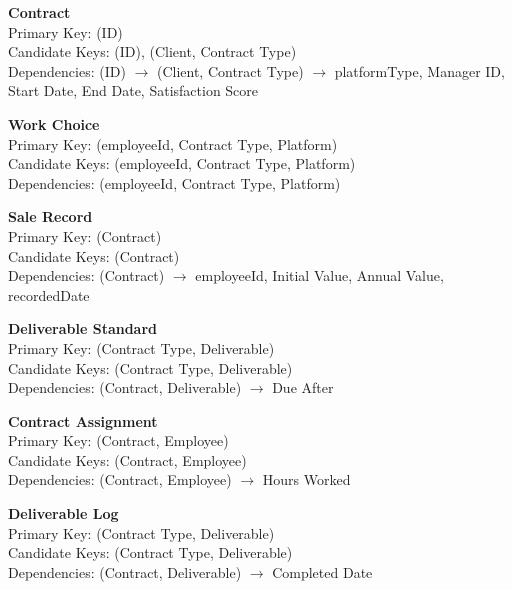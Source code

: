\documentclass[12pt, letterpaper]{article}
\begin{document}
\textbf{Contract}\\
Primary Key: (ID)\\
Candidate Keys: (ID), (Client, Contract Type)\\
Dependencies: (ID) $\rightarrow$ (Client, Contract Type) $\rightarrow$ platformType, Manager ID, Start Date, End Date, Satisfaction Score

\textbf{Work Choice}\\
Primary Key: (employeeId, Contract Type, Platform)\\
Candidate Keys: (employeeId, Contract Type, Platform)\\
Dependencies: (employeeId, Contract Type, Platform)

\textbf{Sale Record}\\
Primary Key: (Contract)\\
Candidate Keys: (Contract)\\
Dependencies: (Contract) $\rightarrow$ employeeId, Initial Value, Annual Value, recordedDate

\textbf{Deliverable Standard}\\
Primary Key: (Contract Type, Deliverable)\\
Candidate Keys: (Contract Type, Deliverable)\\
Dependencies: (Contract, Deliverable) $\rightarrow$ Due After

\textbf{Contract Assignment}\\
Primary Key: (Contract, Employee)\\
Candidate Keys: (Contract, Employee)\\
Dependencies: (Contract, Employee) $\rightarrow$ Hours Worked

\textbf{Deliverable Log}\\
Primary Key: (Contract Type, Deliverable)\\
Candidate Keys: (Contract Type, Deliverable)\\
Dependencies: (Contract, Deliverable) $\rightarrow$ Completed Date
\end{document}
